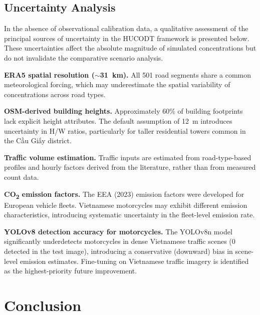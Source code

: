 \documentclass[12pt,a4paper]{article}
\begin{document}
\subsection{Uncertainty Analysis}
\label{sec:uncertainty}

In the absence of observational calibration data, a qualitative assessment of the principal sources of uncertainty in the HUCODT framework is presented below. These uncertainties affect the absolute magnitude of simulated concentrations but do not invalidate the comparative scenario analysis.

\textbf{ERA5 spatial resolution ($\sim$31~km).} All 501 road segments share a common meteorological forcing, which may underestimate the spatial variability of concentrations across road types.

\textbf{OSM-derived building heights.} Approximately 60\% of building footprints lack explicit height attributes. The default assumption of 12~m introduces uncertainty in H/W ratios, particularly for taller residential towers common in the {\selectfont Cầu Giấy} district.

\textbf{Traffic volume estimation.} Traffic inputs are estimated from road-type-based profiles and hourly factors derived from the literature, rather than from measured count data.

\textbf{CO\textsubscript{2} emission factors.} The EEA (2023) emission factors were developed for European vehicle fleets. Vietnamese motorcycles may exhibit different emission characteristics, introducing systematic uncertainty in the fleet-level emission rate.

\textbf{YOLOv8 detection accuracy for motorcycles.} The YOLOv8n model significantly underdetects motorcycles in dense Vietnamese traffic scenes (0 detected in the test image), introducing a conservative (downward) bias in scene-level emission estimates. Fine-tuning on Vietnamese traffic imagery is identified as the highest-priority future improvement.

\section{Conclusion}
\end{document}
